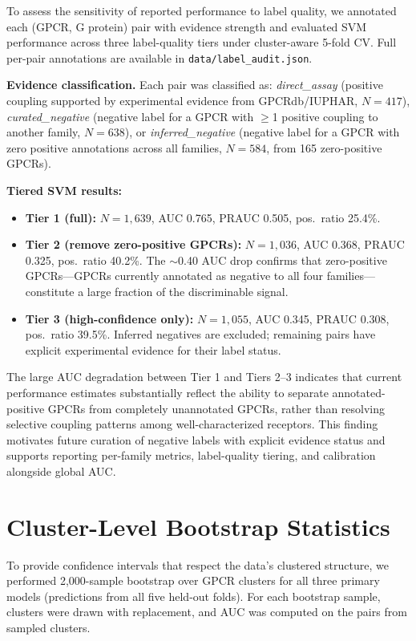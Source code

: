 \documentclass[11pt,a4paper]{article}
\begin{document}
To assess the sensitivity of reported performance to label quality, we annotated each (GPCR, G protein) pair with evidence strength and evaluated SVM performance across three label-quality tiers under cluster-aware 5-fold CV. Full per-pair annotations are available in \texttt{data/label\_audit.json}.

\textbf{Evidence classification.} Each pair was classified as: \textit{direct\_assay} (positive coupling supported by experimental evidence from GPCRdb/IUPHAR, $N=417$), \textit{curated\_negative} (negative label for a GPCR with $\ge$1 positive coupling to another family, $N=638$), or \textit{inferred\_negative} (negative label for a GPCR with zero positive annotations across all families, $N=584$, from 165 zero-positive GPCRs).

\textbf{Tiered SVM results:}
\begin{itemize}
  \item \textbf{Tier 1 (full):} $N=1,639$, AUC 0.765, PRAUC 0.505, pos.\ ratio 25.4\%.
  \item \textbf{Tier 2 (remove zero-positive GPCRs):} $N=1,036$, AUC 0.368, PRAUC 0.325, pos.\ ratio 40.2\%. The $\sim$0.40 AUC drop confirms that zero-positive GPCRs---GPCRs currently annotated as negative to all four families---constitute a large fraction of the discriminable signal.
  \item \textbf{Tier 3 (high-confidence only):} $N=1,055$, AUC 0.345, PRAUC 0.308, pos.\ ratio 39.5\%. Inferred negatives are excluded; remaining pairs have explicit experimental evidence for their label status.
\end{itemize}

The large AUC degradation between Tier 1 and Tiers 2--3 indicates that current performance estimates substantially reflect the ability to separate annotated-positive GPCRs from completely unannotated GPCRs, rather than resolving selective coupling patterns among well-characterized receptors. This finding motivates future curation of negative labels with explicit evidence status and supports reporting per-family metrics, label-quality tiering, and calibration alongside global AUC.

\section{Cluster-Level Bootstrap Statistics}

To provide confidence intervals that respect the data's clustered structure, we performed 2,000-sample bootstrap over GPCR clusters for all three primary models (predictions from all five held-out folds). For each bootstrap sample, clusters were drawn with replacement, and AUC was computed on the pairs from sampled clusters.
\end{document}
